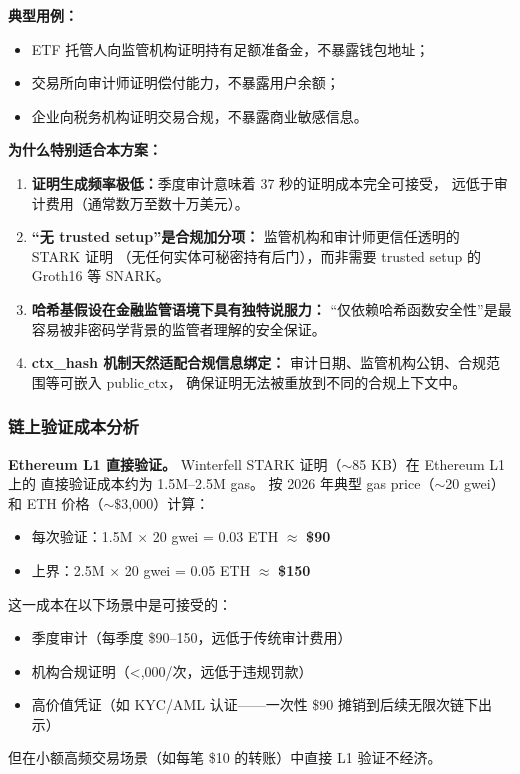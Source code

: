 \documentclass[11pt,a4paper]{ctexart}
\begin{document}
\textbf{典型用例：}
\begin{itemize}[leftmargin=*]
\item ETF 托管人向监管机构证明持有足额准备金，不暴露钱包地址；
\item 交易所向审计师证明偿付能力，不暴露用户余额；
\item 企业向税务机构证明交易合规，不暴露商业敏感信息。
\end{itemize}

\textbf{为什么特别适合本方案：}
\begin{enumerate}[leftmargin=*]
\item \textbf{证明生成频率极低：}季度审计意味着 37 秒的证明成本完全可接受，
远低于审计费用（通常数万至数十万美元）。
\item \textbf{``无 trusted setup''是合规加分项：}
监管机构和审计师更信任透明的 STARK 证明
（无任何实体可秘密持有后门），而非需要 trusted setup 的 Groth16 等 SNARK。
\item \textbf{哈希基假设在金融监管语境下具有独特说服力：}
``仅依赖哈希函数安全性''是最容易被非密码学背景的监管者理解的安全保证。
\item \textbf{ctx\_hash 机制天然适配合规信息绑定：}
审计日期、监管机构公钥、合规范围等可嵌入 $\mathrm{public\_ctx}$，
确保证明无法被重放到不同的合规上下文中。
\end{enumerate}

\subsubsection{链上验证成本分析}

\textbf{Ethereum L1 直接验证。}
Winterfell STARK 证明（$\sim$85 KB）在 Ethereum L1 上的
直接验证成本约为 1.5M--2.5M gas。
按 2026 年典型 gas price（$\sim$20 gwei）和 ETH 价格（$\sim$$\$$3,000）计算：
\begin{itemize}[leftmargin=*]
\item 每次验证：1.5M $\times$ 20 gwei = 0.03 ETH $\approx$ \textbf{\$90}
\item 上界：2.5M $\times$ 20 gwei = 0.05 ETH $\approx$ \textbf{\$150}
\end{itemize}
这一成本在以下场景中是可接受的：
\begin{itemize}[leftmargin=*]
\item 季度审计（每季度 \$90--150，远低于传统审计费用）
\item 机构合规证明（{<},000/次，远低于违规罚款）
\item 高价值凭证（如 KYC/AML 认证——一次性 \$90 摊销到后续无限次链下出示）
\end{itemize}
但在小额高频交易场景（如每笔 \$10 的转账）中直接 L1 验证不经济。
\end{document}
